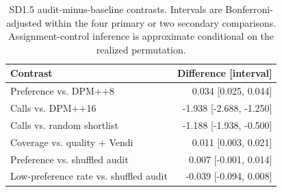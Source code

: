 \begin{table}[t]\centering\small
\caption{SD1.5 audit-minus-baseline contrasts. Intervals are Bonferroni-adjusted within the four primary or two secondary comparisons. Assignment-control inference is approximate conditional on the realized permutation.}
\begin{tabular}{p{}r}\toprule
Contrast & Difference [interval] \\\midrule
Preference vs. DPM++8 & 0.034 [0.025, 0.044] \\
Calls vs. DPM++16 & -1.938 [-2.688, -1.250] \\
Calls vs. random shortlist & -1.188 [-1.938, -0.500] \\
Coverage vs. quality + Vendi & 0.011 [0.003, 0.021] \\
\midrule
Preference vs. shuffled audit & 0.007 [-0.001, 0.014] \\
Low-preference rate vs. shuffled audit & -0.039 [-0.094, 0.008] \\
\bottomrule\end{tabular}\end{table}
